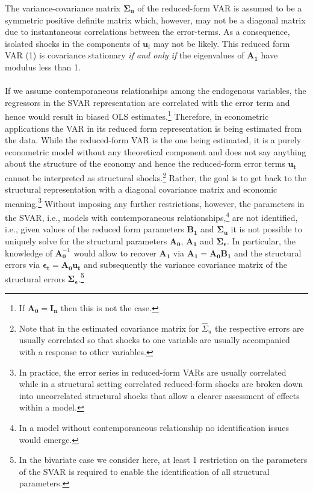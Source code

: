 \documentclass[a4paper,11pt,listof=nochaptergap,oneside,pointednumbers,bibtotoc,bigheadings,liststotoc]{scrbook}
\theoremstyle{mysatz}
\theoremstyle{mydefinition}
\theoremstyle{mybemerkung}
\newcommand{\vect}[1]{\boldsymbol{\mathbf{#1}}}
\begin{document}
The variance-covariance matrix $\vect{\Sigma_u}$ of the reduced-form VAR is assumed to be a symmetric positive definite matrix which, however, may not be a diagonal matrix due to instantaneous correlations between the error-terms. As a consequence, isolated shocks in the components of $\vect{u}_t$ may not be likely. This reduced form VAR (1) is covariance stationary \textit{if and only if} the eigenvalues of $\vect{A_1}$ have modulus less than 1. \\
\\
If we assume contemporaneous relationships among the endogenous variables, the regressors in the SVAR representation are correlated with the error term and hence would result in biased OLS estimates.\footnote{If $\vect{A_0} = \vect{I_n}$ then this is not the case.} Therefore, in econometric applications the VAR in its reduced form representation is being estimated from the data. While the reduced-form VAR is the one being estimated, it is a purely econometric model without any theoretical component and does not say anything about the structure of the economy and hence the reduced-form error terms $\vect{u_t}$ cannot be interpreted as structural shocks.\footnote{Note that in the estimated covariance matrix for ${\hat{\Sigma}_u}$ the respective errors are usually correlated so that shocks to one variable are usually accompanied with a response to other variables.} Rather, the goal is to get back to the structural representation with a diagonal covariance matrix and economic meaning.\footnote{In practice, the error series in reduced-form VARs are usually correlated while in a structural setting correlated reduced-form shocks are broken down into uncorrelated structural shocks that allow a clearer assessment of effects within a model.} Without imposing any further restrictions, however, the parameters in the SVAR, i.e., models with contemporaneous relationships,\footnote{In a model without contemporaneous relationship no identification issues would emerge.} are not identified, i.e., given values of the reduced form parameters $\vect{B_1}$ and $\vect{\Sigma_u}$ it is not possible to uniquely solve for the structural parameters $\vect{A_0}$, $\vect{A_1}$ and $\vect{\Sigma_\epsilon}$. In particular, the knowledge of $\vect{A_0^{-1}}$ would allow to recover $\vect{A_1}$ via $\vect{A_1} = \vect{A_0}\vect{B_1}$ and the structural errors via $\vect{\epsilon_t} = \vect{A_0}\vect{u_t}$ and subsequently the variance covariance matrix of the structural errors $\vect{\Sigma_\epsilon}$.\footnote{In the bivariate case we consider here, at least 1 restriction on the parameters of the SVAR is required to enable the identification of all structural parameters. }\\
\end{document}
